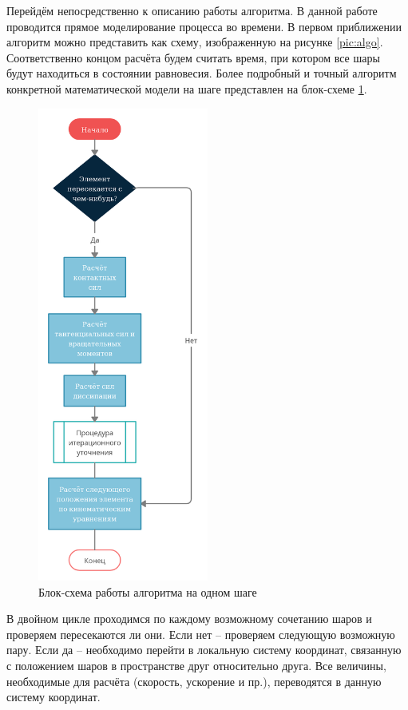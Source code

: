 \documentclass[utf8x, 14pt, oneside, a4paper]{article}
\begin{document}
    
Перейдём непосредственно к описанию работы алгоритма.
В данной работе проводится прямое моделирование процесса во времени.
В первом приближении алгоритм можно представить как схему, изображенную на рисунке \ref{pic:algo}. 
Соответственно концом расчёта будем считать время, при котором все шары будут находиться в состоянии равновесия.
Более подробный и точный алгоритм конкретной математической модели на шаге представлен на блок-схеме \ref{pic:osn_block}.

\begin{figure}[H]
	\centering
	\includegraphics[width=0.5\textwidth]{big_block}
	\caption{Блок-схема работы алгоритма на одном шаге}
	\label{pic:osn_block}
\end{figure} 

В двойном цикле проходимся по каждому возможному сочетанию шаров и проверяем пересекаются ли они.
Если нет -- проверяем следующую возможную пару.
Если да -- необходимо перейти в локальную систему координат, связанную с положением шаров в пространстве друг относительно друга. Все величины, необходимые для расчёта (скорость, ускорение и пр.), переводятся в данную систему координат.
\end{document}
